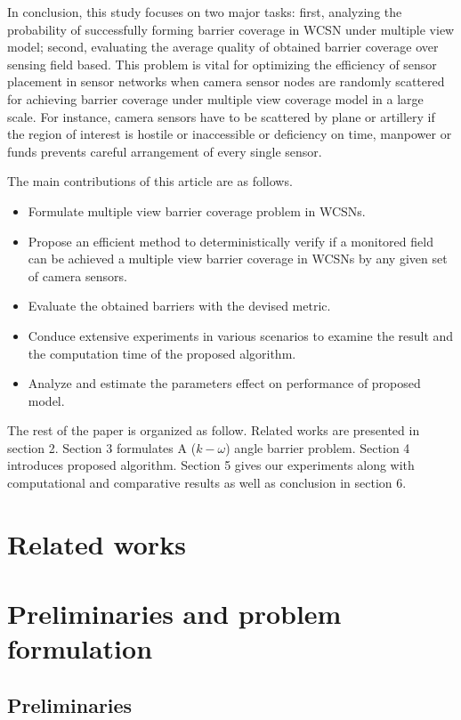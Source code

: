 \documentclass[3p]{elsarticle}
\begin{document}
In conclusion, this study focuses on two major tasks: first, analyzing the probability of successfully forming barrier coverage in WCSN under multiple view model; second, evaluating the average quality of obtained barrier coverage over sensing field based. This problem is vital for optimizing the efficiency of sensor placement in sensor networks when camera sensor nodes are randomly scattered for achieving barrier coverage under multiple view coverage model in a large scale. For instance, camera sensors have to be scattered by plane or artillery if the region of interest is hostile or inaccessible or deficiency on time, manpower or funds prevents careful arrangement of every single sensor.\par
%
The main contributions of this article are as follows. 
\begin{itemize}
	\item Formulate multiple view barrier coverage problem in WCSNs.
	\item Propose an efficient method to deterministically verify if a monitored field can be achieved a multiple view barrier coverage in WCSNs by any given set of camera sensors. 
	\item Evaluate the obtained barriers with the devised metric.
	\item Conduce extensive experiments in various scenarios to examine the result and the computation time of the proposed algorithm.
	\item Analyze and estimate the parameters effect on performance of proposed model.
\end{itemize}
%
The rest of the paper is organized as follow. Related works are presented in section 2. Section 3 formulates A ($k-\omega$) angle barrier problem. Section 4 introduces proposed algorithm. Section 5 gives our experiments along with computational and comparative results as well as conclusion in section 6.
%

\section{Related works}


\section{Preliminaries and problem formulation}
\subsection{Preliminaries}


\end{document}
